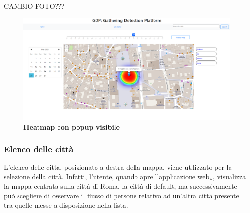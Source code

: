 CAMBIO FOTO???
\begin{center}
	\begin{figure}[H]
		\centering\includegraphics[width=0.9\linewidth]{../immagini/manualeUtente/popup.png}
		\caption{\textbf{\textbf{\textbf{Heatmap con popup visibile}}}}
	\end{figure}
\end{center}

\subsubsection{Elenco delle città} \label{UtilizzoDiGDPGatheringDetecionPlatformContenutoCentralePaginaInizialeHomeMenùATendina}
L'elenco delle città, posizionato a destra della mappa, viene utilizzato per la selezione della città. Infatti, l'utente, quando apre l'applicazione web$_{\scaleto{G}{3pt}}$, visualizza la mappa centrata sulla città di Roma, la città di default, ma successivamente può scegliere di osservare il flusso di persone relativo ad un'altra città presente tra quelle messe a disposizione nella lista.


